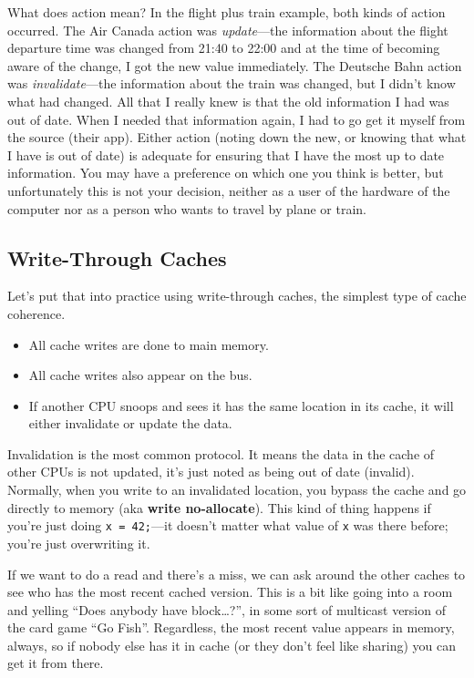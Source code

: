 \documentclass[a4paper]{report}
\begin{document}
What does action mean? In the flight plus train example, both kinds of action occurred. The Air Canada action was \textit{update}---the information about the flight departure time was changed from 21:40 to 22:00 and at the time of becoming aware of the change, I got the new value immediately. The Deutsche Bahn action was \textit{invalidate}---the information about the train was changed, but I didn't know what had changed. All that I really knew is that the old information I had was out of date. When I needed that information again, I had to go get it myself from the source (their app). Either action (noting down the new, or knowing that what I have is out of date) is adequate for ensuring that I have the most up to date information. You may have a preference on which one you think is better, but unfortunately this is not your decision, neither as a user of the hardware of the computer nor as  a person who wants to travel by plane or train.

\subsection*{Write-Through Caches}
Let's put that into practice using write-through caches, the simplest type of
cache coherence.
  \begin{itemize}
    \item All cache writes are done to main memory.
    \item All cache writes also appear on the bus.
    \item If another CPU snoops and sees it has the same location in
      its cache, it will either invalidate or update the
      data.
  \end{itemize}
  
Invalidation is the most common protocol. It means the data in the cache of other CPUs is not updated, it's just noted as being out of date (invalid).  Normally, when you write to an invalidated location, you bypass the cache and go directly to memory (aka {\bf write no-allocate}). This kind of thing happens if you're just doing \texttt{x = 42;}---it doesn't matter what value of \texttt{x} was there before; you're just overwriting it.

If we want to do a read and there's a miss, we can ask around the other caches to see who has the most recent cached version. This is a bit like going into a room and yelling ``Does anybody have block\ldots?'', in some sort of multicast version of the card game ``Go Fish''. Regardless, the most recent value appears in memory, always, so if nobody else has it in cache (or they don't feel like sharing) you can get it from there.
\end{document}
